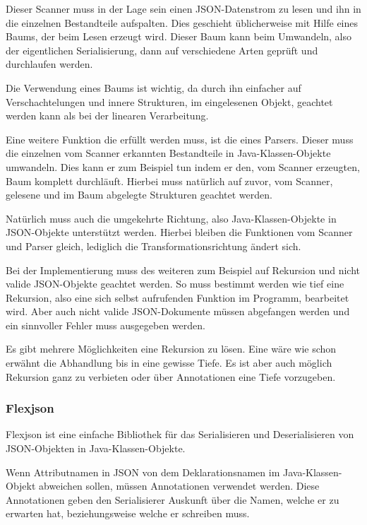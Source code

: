 Dieser Scanner muss in der Lage sein einen \ac{JSON}-Datenstrom zu lesen und ihn in die einzelnen Bestandteile aufspalten. Dies geschieht \"ublicherweise mit Hilfe eines Baums, der beim Lesen erzeugt wird. Dieser Baum kann beim Umwandeln, also der eigentlichen Serialisierung, dann auf verschiedene Arten gepr\"uft und durchlaufen werden.

Die Verwendung eines Baums ist wichtig, da durch ihn einfacher auf Verschachtelungen und innere Strukturen, im eingelesenen Objekt, geachtet werden kann als bei der linearen Verarbeitung. \cite{JahnBaum}

Eine weitere Funktion die erf\"ullt werden muss, ist die eines Parsers. Dieser muss die einzelnen vom Scanner erkannten Bestandteile in Java-Klassen-Objekte umwandeln. Dies kann er zum Beispiel tun indem er den, vom Scanner erzeugten, Baum komplett durchl\"auft. Hierbei muss nat\"urlich auf zuvor, vom Scanner, gelesene und im Baum abgelegte Strukturen geachtet werden.

Nat\"urlich muss auch die umgekehrte Richtung, also Java-Klassen-Objekte in \ac{JSON}-Objekte unterst\"utzt werden. Hierbei bleiben die Funktionen vom Scanner und Parser gleich, lediglich die Transformationsrichtung \"andert sich.

Bei der Implementierung muss des weiteren zum Beispiel auf Rekursion und nicht valide \ac{JSON}-Objekte geachtet werden. So muss bestimmt werden wie tief eine Rekursion, also eine sich selbst aufrufenden Funktion im Programm, bearbeitet wird. Aber auch nicht valide JSON-Dokumente m\"ussen abgefangen werden und ein sinnvoller Fehler muss ausgegeben werden.

Es gibt mehrere M\"oglichkeiten eine Rekursion zu l\"osen. Eine w\"are wie schon erw\"ahnt die Abhandlung bis in eine gewisse Tiefe. Es ist aber auch m\"oglich Rekursion ganz zu verbieten oder \"uber Annotationen eine Tiefe vorzugeben.

\subsubsection{Flexjson}
Flexjson ist eine einfache Bibliothek f\"ur das Serialisieren und Deserialisieren von \ac{JSON}-Objekten in Java-Klassen-Objekte.\cite{FlexJSON}

Wenn Attributnamen in \ac{JSON} von dem Deklarationsnamen im Java-Klassen-Objekt abweichen sollen, m\"ussen Annotationen verwendet werden. Diese Annotationen geben den Serialisierer Auskunft \"uber die Namen, welche er zu erwarten hat, beziehungsweise welche er schreiben muss.

